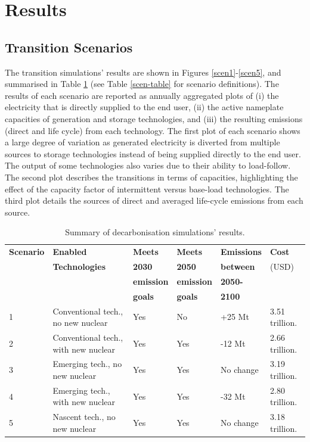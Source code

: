 \section{Results} \label{Results-and-discussion}

\subsection{Transition Scenarios}

The transition simulations' results are shown in Figures \ref{scen1}-\ref{scen5}, and summarised in Table \ref{tab:results_summary} (see Table \ref{scen-table} for scenario definitions). The results of each scenario are reported as annually aggregated plots of (i) the electricity that is directly supplied to the end user, (ii) the active nameplate capacities of generation and storage technologies, and (iii) the resulting emissions (direct and life cycle) from each technology. The first plot of each scenario shows a large degree of variation as generated electricity is diverted from multiple sources to storage technologies instead of being supplied directly to the end user. The output of some technologies also varies due to their ability to load-follow. The second plot describes the transitions in terms of capacities, highlighting the effect of the capacity factor of intermittent versus base-load technologies. The third plot details the sources of direct and averaged life-cycle emissions from each source.

\begin{table}[H]
\centering
	\caption{Summary of decarbonisation simulations' results.}
	\vspace{0.1in}
	\begin{tabularx}{0.9\textwidth}{p{} p{}p{}p{}p{}p{}}
		\hline
\textbf{Scenario} & \textbf{Enabled} & \textbf{Meets} & \textbf{Meets} & \textbf{Emissions} & \textbf{Cost} \\
 & \textbf{Technologies} & \textbf{2030} & \textbf{2050} & \textbf{between} & (USD) \\
 &  & \textbf{emission} & \textbf{emission} & \textbf{2050-} &  \\
 &  & \textbf{goals} & \textbf{goals} & \textbf{2100} &  \\
\hline
1 & Conventional tech., no new nuclear & Yes & No & +25 Mt & 3.51 trillion. \\
2 & Conventional tech., with new nuclear & Yes & Yes & -12 Mt & 2.66 trillion. \\
3 & Emerging tech., no new nuclear & Yes & Yes & No change & 3.19 trillion. \\
4 & Emerging tech., with new nuclear & Yes & Yes & -32 Mt & 2.80 trillion. \\
5 & Nascent tech., no new nuclear & Yes & Yes & No change & 3.18 trillion. \\
\hline 
	\end{tabularx}
\label{tab:results_summary}
\end{table}

